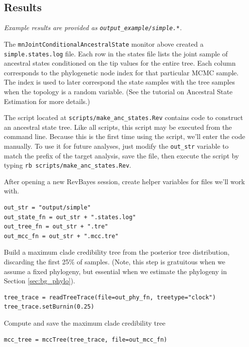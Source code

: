 \subsection*{Results}

{\it Example results are provided as {\tt output\_example/simple.*}.}

The {\tt mnJointConditionalAncestralState} monitor above created a {\tt simple.states.log} file.
Each row in the states file lists the joint sample of ancestral states conditioned on the tip values for the entire tree.
Each column corresponds to the phylogenetic node index for that particular MCMC sample.
The index is used to later correspond the state samples with the tree samples when the topology is a random variable.
(See the tutorial on Ancestral State Estimation for more details.)

The script located at {\tt scripts/make\_anc\_states.Rev} contains code to construct an ancestral state tree.
Like all \RevBayes scripts, this script may be executed from the command line.
Because this is the first time using the script, we'll enter the code manually.
To use it for future analyses, just modify the {\tt out\_str} variable to match the prefix of the target analysis, save the file, then execute the script by typing {\tt rb scripts/make\_anc\_states.Rev}.

After opening a new RevBayes session, create helper variables for files we'll work with.
\begin{snugshade}
\begin{lstlisting}
out_str = "output/simple"
out_state_fn = out_str + ".states.log"
out_tree_fn = out_str + ".tre"
out_mcc_fn = out_str + ".mcc.tre" 
\end{lstlisting}
\end{snugshade}

Build a maximum clade credibility tree from the posterior tree distribution, discarding the first 25\% of samples.
(Note, this step is gratuitous when we assume a fixed phylogeny, but essential when we estimate the phylogeny in Section \ref{sec:bg_phylo}).

\begin{snugshade}
\begin{lstlisting}
tree_trace = readTreeTrace(file=out_phy_fn, treetype="clock")
tree_trace.setBurnin(0.25)
\end{lstlisting}
\end{snugshade}

Compute and save the maximum clade credibility tree
\begin{snugshade}
\begin{lstlisting}
mcc_tree = mccTree(tree_trace, file=out_mcc_fn)
\end{lstlisting}
\end{snugshade}

